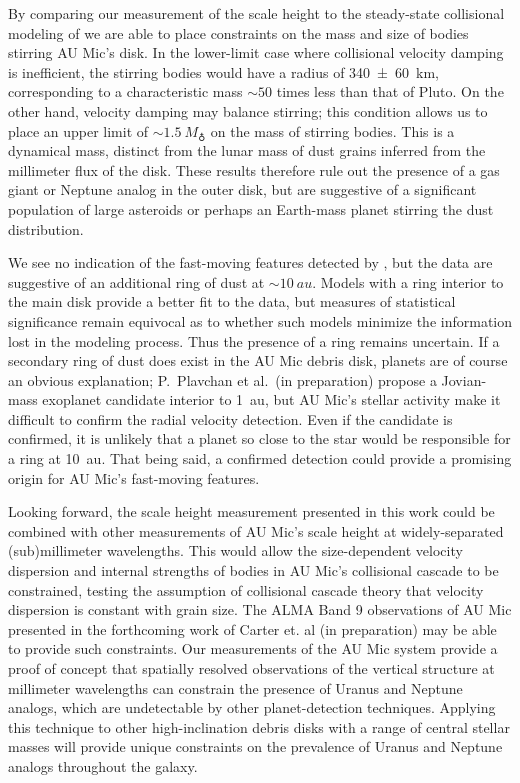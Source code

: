 \documentclass[modern]{aastex62}
\begin{document}
By comparing our measurement of the scale height to the steady-state collisional modeling of \cite{pan&schlichting12} we are able to place constraints on the mass and size of bodies stirring AU Mic's disk.
In the lower-limit case where collisional velocity damping is inefficient, the stirring bodies would have a radius of \SI{340 \pm 60}{km}, corresponding to a characteristic mass $\sim 50$ times less than that of Pluto.
On the other hand, velocity damping may balance stirring; this condition allows us to place an upper limit of $\sim \SI{1.5}{M_\earth}$ on the mass of stirring bodies.
This is a dynamical mass, distinct from the lunar mass of dust grains inferred from the millimeter flux of the disk.
These results therefore rule out the presence of a gas giant or Neptune analog in the outer disk, but are suggestive of a significant population of large asteroids or perhaps an Earth-mass planet stirring the dust distribution.  

We see no indication of the fast-moving features detected by \cite{boccaletti15}, but the data are suggestive of an additional ring of dust at $\sim \SI{10}{au}$.
Models with a ring interior to the main disk provide a better fit to the data, but measures of statistical significance remain equivocal as to whether such models minimize the information lost in the modeling process.
Thus the presence of a ring remains uncertain.
If a secondary ring of dust does exist in the AU Mic debris disk, planets are of course an obvious explanation; P.~Plavchan et al.~(in preparation) propose a Jovian-mass exoplanet candidate interior to \SI{1}{au}, but AU Mic's stellar activity make it difficult to confirm the radial velocity detection.
Even if the candidate is confirmed, it is unlikely that a planet so close to the star would be responsible for a ring at \SI{10}{au}.
That being said, a confirmed detection could provide a promising origin for AU Mic's fast-moving features.

Looking forward, the scale height measurement presented in this work could be combined with other measurements of AU Mic's scale height at widely-separated (sub)millimeter wavelengths.
This would allow the size-dependent velocity dispersion and internal strengths of bodies in AU Mic's collisional cascade to be constrained, testing the assumption of collisional cascade theory that velocity dispersion is constant with grain size.
The ALMA Band 9 observations of AU Mic presented in the forthcoming work of Carter et. al (in preparation) may be able to provide such constraints.
Our measurements of the AU Mic system provide a proof of concept that spatially resolved observations of the vertical structure at millimeter wavelengths can constrain the presence of Uranus and Neptune analogs, which are undetectable by other planet-detection techniques.  
Applying this technique to other high-inclination debris disks with a range of central stellar masses will provide unique constraints on the prevalence of Uranus and Neptune analogs throughout the galaxy.
\end{document}
